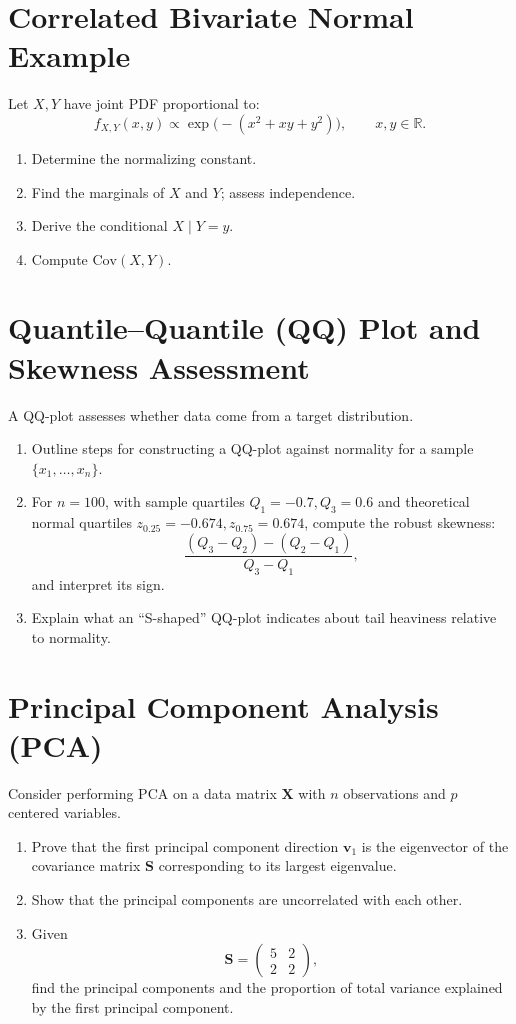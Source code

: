 \documentclass[12pt,a4paper]{article}
\begin{document}
\section{Correlated Bivariate Normal Example}
Let \( X,Y \) have joint PDF proportional to:
\[
f_{X,Y}(x,y) \propto \exp\!\big(-(x^2 + xy + y^2)\big), \qquad x,y\in\mathbb{R}.
\]
\begin{enumerate}[label=(\arabic*)]
\item Determine the normalizing constant.
\item Find the marginals of \( X \) and \( Y \); assess independence.
\item Derive the conditional \( X\mid Y=y \).
\item Compute \( \mathrm{Cov}(X,Y) \).
\end{enumerate}

\section{Quantile–Quantile (QQ) Plot and Skewness Assessment}
A QQ-plot assesses whether data come from a target distribution.
\begin{enumerate}[label=(\arabic*)]
\item Outline steps for constructing a QQ-plot against normality for a sample \( \{x_1,\ldots,x_n\} \).
\item For \( n=100 \), with sample quartiles \( Q_1=-0.7, Q_3=0.6 \) and theoretical normal quartiles \( z_{0.25}=-0.674, z_{0.75}=0.674 \), compute the robust skewness:
\[
\frac{(Q_3-Q_2)-(Q_2-Q_1)}{Q_3-Q_1},
\]
and interpret its sign.
\item Explain what an ``S-shaped'' QQ-plot indicates about tail heaviness relative to normality.
\end{enumerate}



\section{Principal Component Analysis (PCA)}
Consider performing PCA on a data matrix \( \mathbf{X} \) with \( n \) observations and \( p \) centered variables.
\begin{enumerate}[label=(\arabic*)]
\item Prove that the first principal component direction \( \mathbf{v}_1 \) is the eigenvector of the covariance matrix \( \mathbf{S} \) corresponding to its largest eigenvalue.
\item Show that the principal components are uncorrelated with each other.
\item Given
\[
\mathbf{S} =
\begin{pmatrix}
5 & 2 \\
2 & 2
\end{pmatrix},
\]
find the principal components and the proportion of total variance explained by the first principal component.
\end{enumerate}
\end{document}
